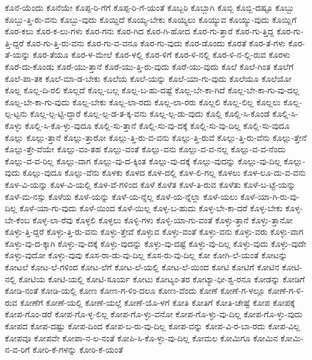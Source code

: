 {ಕೊನೆ-ಯೆಂದು
ಕೊನೆಯೇ
ಕೊಪ್ಪ-ರಿ-ಗೆಗೆ
ಕೊಪ್ಪ-ರಿ-ಗೆ-ಯಂತೆ
ಕೊಬ್ಬರಿ
ಕೊಬ್ಬಾಗಿ
ಕೊಬ್ಬಿ
ಕೊಬ್ಬಿ-ದಷ್ಟೂ
ಕೊಬ್ಬು
ಕೊಬ್ಬು-ತ್ತಿ-ರು-ವನು
ಕೊಬ್ಬು-ವುದು
ಕೊಯ್ದಿದೆ
ಕೊಯ್ಯ-ಬೇಕು
ಕೊಯ್ಯಲು
ಕೊಯ್ಯುವ
ಕೊಯ್ಯು-ವುದು
ಕೊಯ್ಲಿಗೆ
ಕೊರ-ಕಲು
ಕೊರ-ಕ-ಲು-ಗಳು
ಕೊರ-ಗನು
ಕೊರ-ಗಿದ
ಕೊರ-ಗಿ-ಹೋದ
ಕೊರ-ಗು-ತ್ತಾರೆ
ಕೊರ-ಗು-ತ್ತಿದ್ದ
ಕೊರ-ಗು-ತ್ತಿ-ದ್ದರೆ
ಕೊರ-ಗು-ತ್ತಿ-ರು-ವನು
ಕೊರ-ಗು-ವ-ವನೂ
ಕೊರ-ಗು-ವುದು
ಕೊರ-ಡೊಂದು
ಕೊರತೆ
ಕೊರ-ತೆ-ಗಳು
ಕೊರ-ತೆ-ಯನ್ನು
ಕೊರ-ತೆಯೂ
ಕೊರ-ಳ-ಮೇಲೆ
ಕೊರ-ಳಲ್ಲಿ
ಕೊರ-ಳಿಗೆ
ಕೊರ-ಳಿ-ನಲ್ಲಿ
ಕೊರ-ಳಿ-ನ-ಲ್ಲಿ-ರುವ
ಕೊರಳು
ಕೊರೆ-ದು-ಕೊಂಡು
ಕೊರೆ-ಯು-ತ್ತಾನೆ
ಕೊರೆ-ಯು-ತ್ತಿ-ರು-ವುದು
ಕೊರೆ-ಯು-ವುದು
ಕೊಲೆ
ಕೊಲೆ-ಗಿಂತ
ಕೊಲೆಗೆ
ಕೊಲೆ-ಪಾ-ತಕ
ಕೊಲೆ-ಮಾ-ಡ-ಬೇಕು
ಕೊಲೆಯ
ಕೊಲೆ-ಯನ್ನು
ಕೊಲೆ-ಯಾ-ಗು-ವುದು
ಕೊಲೆಯೂ
ಕೊಲೆಯೋ
ಕೊಲ್ಲ
ಕೊಲ್ಲ-ದಿ-ರಲಿ
ಕೊಲ್ಲದೆ
ಕೊಲ್ಲ-ಬಲ್ಲ
ಕೊಲ್ಲ-ಬ-ಹು-ದಷ್ಟೆ
ಕೊಲ್ಲ-ಬೇ-ಕಾ-ಗಿದೆ
ಕೊಲ್ಲ-ಬೇ-ಕಾ-ಗು-ವು-ದಲ್ಲ
ಕೊಲ್ಲ-ಬೇ-ಕಾ-ಗು-ವುದು
ಕೊಲ್ಲ-ಬೇಕು
ಕೊಲ್ಲ-ಲಾ-ರದು
ಕೊಲ್ಲ-ಲಾ-ರರು
ಕೊಲ್ಲಲಿ
ಕೊಲ್ಲ-ಲಿಲ್ಲ
ಕೊಲ್ಲಲು
ಕೊಲ್ಲ-ಲ್ಪ-ಟ್ಟನು
ಕೊಲ್ಲ-ಲ್ಪ-ಟ್ಟಿ-ದ್ದಾರೆ
ಕೊಲ್ಲ-ಲ್ಪ-ಡ-ತ-ಕ್ಕ-ವನು
ಕೊಲ್ಲ-ಲ್ಪ-ಡು-ವುದು
ಕೊಲ್ಲಿ
ಕೊಲ್ಲಿ-ಸಿ-ಕೊಂಡೆ
ಕೊಲ್ಲಿ-ಸಿ-ಕೊಳ್ಳು
ಕೊಲ್ಲಿ-ಸಿ-ಕೊ-ಳ್ಳು-ವುದೂ
ಕೊಲ್ಲಿ-ಸು-ತ್ತಾನೆ
ಕೊಲ್ಲಿ-ಸು-ವು-ದಕ್ಕೆ
ಕೊಲ್ಲಿ-ಸು-ವು-ದಿಲ್ಲ
ಕೊಲ್ಲಿ-ಸು-ವುದೂ
ಕೊಲ್ಲು
ಕೊಲ್ಲು-ತ್ತಾನೆ
ಕೊಲ್ಲು-ತ್ತಾರೋ
ಕೊಲ್ಲು-ತ್ತಿ-ರು-ವ-ವನು
ಕೊಲ್ಲು-ತ್ತಿ-ರುವೆ
ಕೊಲ್ಲು-ತ್ತಿ-ರು-ವೆನು
ಕೊಲ್ಲು-ತ್ತೇನೆ
ಕೊಲ್ಲು-ತ್ತೇ-ವೆಯೇ
ಕೊಲ್ಲು-ವಂ-ತಹ
ಕೊಲ್ಲು-ವಂತೆ
ಕೊಲ್ಲು-ವನು
ಕೊಲ್ಲು-ವ-ವ-ನಲ್ಲ
ಕೊಲ್ಲು-ವ-ವ-ನೆಂದು
ಕೊಲ್ಲು-ವ-ವ-ರಿಲ್ಲ
ಕೊಲ್ಲು-ವಾಗ
ಕೊಲ್ಲು-ವು-ದ-ಕ್ಕಿಂತ
ಕೊಲ್ಲು-ವು-ದಕ್ಕೆ
ಕೊಲ್ಲು-ವುದನ್ನು
ಕೊಲ್ಲು-ವು-ದಿಲ್ಲ
ಕೊಲ್ಲು-ವುದು
ಕೊಲ್ಲು-ವುದೂ
ಕೊಲ್ಲು-ವೆನು
ಕೊಳಕು
ಕೊಳದ
ಕೊಳ-ದಲ್ಲಿ
ಕೊಳ-ಲಿ-ಗಲ್ಲ
ಕೊಳಲು
ಕೊಳ-ಲೂ-ದು-ವ-ವನು
ಕೊಳ-ವಿ-ಯನ್ನು
ಕೊಳ-ವಿ-ಯಲ್ಲಿ
ಕೊಳ-ವೆ-ಗಳಿಂದ
ಕೊಳೆ
ಕೊಳೆತ
ಕೊಳೆ-ತಿ-ರುವ
ಕೊಳೆತು
ಕೊಳೆ-ಬ-ಟ್ಟೆ-ಯನ್ನು
ಕೊಳೆ-ಮ-ನಸ್ಸು
ಕೊಳೆಯ
ಕೊಳೆ-ಯನ್ನು
ಕೊಳೆ-ಯ-ನ್ನೆಲ್ಲ
ಕೊಳೆ-ಯ-ನ್ನೆಲ್ಲಾ
ಕೊಳೆ-ಯಲು
ಕೊಳೆ-ಯಾ-ಗಿ-ರು-ವು-ದಿಲ್ಲ
ಕೊಳೆ-ಯಾ-ಗು-ವುದು
ಕೊಳೆ-ಯಿಂದ
ಕೊಳೆ-ಯಿಲ್ಲ
ಕೊಳ್ಳ-ಬ-ಹುದು
ಕೊಳ್ಳ-ಬೇ-ಕಾ-ದರೆ
ಕೊಳ್ಳ-ಬೇಕು
ಕೊಳ್ಳ-ಬೇ-ಕೆಂಬ
ಕೊಳ್ಳ-ಲಾ-ರೆವು
ಕೊಳ್ಳಲಿ
ಕೊಳ್ಳಲು
ಕೊಳ್ಳಿ-ಗಳು
ಕೊಳ್ಳಿ-ಯಾ-ಗು-ವಂತೆ
ಕೊಳ್ಳು-ತ್ತಾನೆ
ಕೊಳ್ಳು-ತ್ತಾನೋ
ಕೊಳ್ಳು-ತ್ತಿ-ದ್ದರೆ
ಕೊಳ್ಳು-ತ್ತಿ-ರು-ವನು
ಕೊಳ್ಳು-ತ್ತೇವೆ
ಕೊಳ್ಳುವ
ಕೊಳ್ಳು-ವಂತೆ
ಕೊಳ್ಳು-ವನು
ಕೊಳ್ಳು-ವರು
ಕೊಳ್ಳು-ವಾಗ
ಕೊಳ್ಳು-ವು-ದ-ಕ್ಕಾಗಿ
ಕೊಳ್ಳು-ವು-ದಕ್ಕೆ
ಕೊಳ್ಳು-ವುದನ್ನು
ಕೊಳ್ಳು-ವು-ದಷ್ಟೆ
ಕೊಳ್ಳು-ವು-ದಿಲ್ಲ
ಕೊಳ್ಳು-ವುದು
ಕೊಳ್ಳು-ವುದೇ
ಕೊಳ್ಳು-ವುದೋ
ಕೊಳ್ಳು-ವುವು
ಕೊಸ-ರಾ-ಡು-ವು-ದಿಲ್ಲ
ಕೊಸ-ರು-ವು-ದಿಲ್ಲ
ಕೋ
ಕೋಗಿ-ಲೆ-ಯಂತೆ
ಕೋಟನ್ನು
ಕೋಟಲೆ
ಕೋಟ-ಲೆ-ಗಳಿಂದ
ಕೋಟ-ಲೆಗೆ
ಕೋಟ-ಲೆ-ಯಲ್ಲಿ
ಕೋಟ-ಲೆ-ಯಿಂದ
ಕೋಟಿ
ಕೋಟಿಗೆ
ಕೋಟಿನ
ಕೋಟಿ-ನಲ್ಲಿ
ಕೋಟಿಯ
ಕೋಟಿ-ಯಲ್ಲಿ
ಕೋಟಿ-ಸೂರ್ಯ
ಕೋಟು
ಕೋಟ್ಯಂ-ತರ
ಕೋಟ್ಯಾ-ಧೀ-ಶ್ವ-ರನೂ
ಕೋಡನ್ನು
ಕೋಡಿಗೆ
ಕೋಡಿ-ನಂತೆ
ಕೋಡಿ-ಯಲ್ಲಿ
ಕೋಣ
ಕೋಣ-ಗ-ಳಿಂ-ದಲೂ
ಕೋಣ-ವೆಂದು
ಕೋಣೆ
ಕೋಣೆ-ಗ-ಳಲ್ಲೂ
ಕೋಣೆ-ಗ-ಳಿ-ರುವ
ಕೋಣೆಗೆ
ಕೋಣೆ-ಯಲ್ಲಿ
ಕೋಣೆ-ಯಲ್ಲೆ
ಕೋಣೆ-ಯೊ-ಳಗೆ
ಕೋತಿ
ಕೋತಿಗೆ
ಕೋತಿ-ಚೇಷ್ಟೆ
ಕೋಪ
ಕೋಪಕ್ಕೆ
ಕೋಪ-ಗೊಂ-ಡರೆ
ಕೋಪ-ಗೊ-ಳ್ಳ-ಲಿಲ್ಲ
ಕೋಪ-ಗೊ-ಳ್ಳು-ವನೋ
ಕೋಪ-ಗೊ-ಳ್ಳು-ವು-ದಿಲ್ಲ
ಕೋಪ-ಗೊ-ಳ್ಳು-ವುದು
ಕೋಪದ
ಕೋಪ-ದಷ್ಟು
ಕೋಪ-ದಿಂದ
ಕೋಪ-ಬ-ರು-ವು-ದಿಲ್ಲ
ಕೋಪ-ವನ್ನು
ಕೋಪ-ವಿ-ರ-ಬಾ-ರದು
ಕೋಪ-ವಿಲ್ಲ
ಕೋಪವೂ
ಕೋಪವೇ
ಕೋಪಾ-ನ-ಲ-ನಂತೆ
ಕೋಪಿ-ಸಿ-ಕೊ-ಳ್ಳು-ವು-ದಿಲ್ಲ
ಕೋಮಲ
ಕೋಮಿಗೂ
ಕೋಮಿನ
ಕೋಮಿ-ನ-ವ-ರಿಗೆ
ಕೋರಿ-ಕೆ-ಗಳನ್ನು
ಕೋರಿ-ಕೆ-ಯಂತೆ
}
